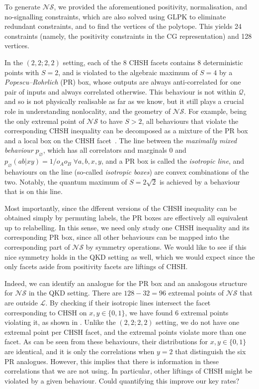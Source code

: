 \documentclass[10pt, a4paper]{article}
\numberwithin{equation}{section} %
\theoremstyle{definition}
\theoremstyle{plain}
\newcommand{\?}{\mathrel{?}} %
\newcommand{\Ls}{\mathcal{L}}
\newcommand{\Qs}{\mathcal{Q}}
\newcommand{\NSs}{\mathcal{NS}}
\begin{document}
      To generate \(\NSs\), we provided the aforementioned positivity, normalisation, and no-signalling constraints, which are also solved using GLPK to eliminate redundant constraints, and to find the vertices of the polytope. This yields 24 constraints (namely, the positivity constraints in the CG representation) and 128 vertices.

      In the \((2,2;2,2)\) setting, each of the 8 CHSH facets contains 8 deterministic points with \(S = 2\), and is violated to the algebraic maximum of \(S = 4\) by a \emph{Popescu–Rohrlich} (PR) box, whose outputs are always anti-correlated for one pair of inputs and always correlated otherwise. This behaviour is not within \(\Qs\), and so is not physically realisable as far as we know, but it still plays a crucial role in understanding nonlocality, and the geometry of \(\NSs\). For example, being the only extremal point of \(\NSs\) to have \(S > 2\), all behaviours that violate the corresponding CHSH inequality can be decomposed as a mixture of the PR box and a local box on the CHSH facet~\cite{GeomDecomp}. The line between the \emph{maximally mixed behaviour} \(p_{\varnothing}\), which has all correlators and marginals 0 and \(p_{\varnothing}(ab|xy) = 1/o_A o_B\; \forall a,b,x,y\), and a PR box is called the \emph{isotropic line}, and behaviours on the line (so-called \emph{isotropic boxes}) are convex combinations of the two. Notably, the quantum maximum of \(S = 2\sqrt{2}\) is achieved by a behaviour that is on this line.

      Most importantly, since the dfferent versions of the CHSH inequality can be obtained simply by permuting labels, the PR boxes are effectively all equivalent up to relabelling. In this sense, we need only study one CHSH inequality and its corresponding PR box, since all other behaviours can be mapped into the corresponding part of \(\NSs\) by symmetry operations. We would like to see if this nice symmetry holds in the QKD setting as well, which we would expect since the only facets aside from positivity facets are liftings of CHSH.

      Indeed, we can identify an analogue for the PR box and an analogous structure for \(\NSs\) in the QKD setting. There are \(128 - 32 = 96\) extremal points of \(\NSs\) that are outside \(\Ls\). By checking if their isotropic lines intersect the facet corresponding to CHSH on \(x, y \in \{0,1\}\), we have found 6 extremal points violating it, as shown in . Unlike the \((2,2;2,2)\) setting, we do not have one extremal point per CHSH facet, and the extremal points violate more than one facet. As can be seen from these behaviours, their distributions for \(x, y \in \{0,1\}\) are identical, and it is only the correlations when \(y = 2\) that distinguish the six PR analogues. However, this implies that there is information in these correlations that we are not using. In particular, other liftings of CHSH might be violated by a given behaviour. Could quantifying this improve our key rates?
\end{document}
